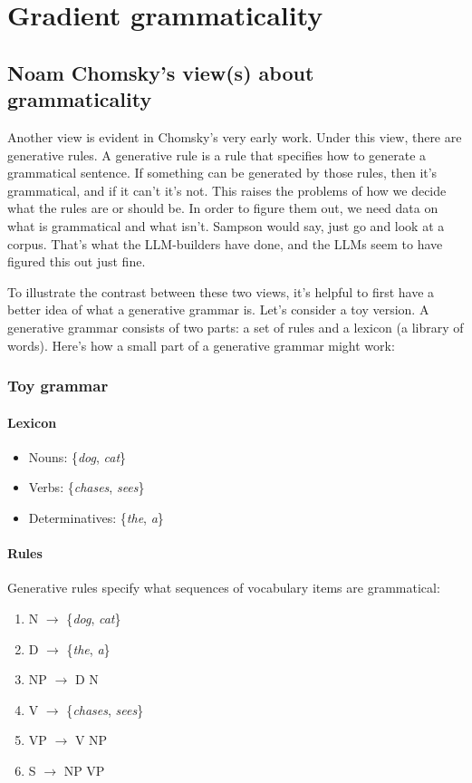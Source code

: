 \chapter{Gradient grammaticality}

\section{Noam Chomsky's view(s) about grammaticality}
Another view is evident in Chomsky's very early work. Under this view, there are generative rules. A generative rule is a rule that specifies how to generate a grammatical sentence. If something can be generated by those rules, then it's grammatical, and if it can't it's not. This raises the problems of how we decide what the rules are or should be. In order to figure them out, we need data on what is grammatical and what isn't. Sampson would say, just go and look at a corpus. That's what the LLM-builders have done, and the LLMs seem to have figured this out just fine.

To illustrate the contrast between these two views, it's helpful to first have a better idea of what a generative grammar is. Let's consider a toy version. A generative grammar consists of two parts: a set of rules and a lexicon (a library of words). Here's how a small part of a generative grammar might work:

\subsection{Toy grammar}

\subsubsection*{Lexicon}
\begin{itemize}
 \item Nouns: \{\textit{dog}, \textit{cat}\}
 \item Verbs: \{\textit{chases}, \textit{sees}\}
 \item Determinatives: \{\textit{the}, \textit{a}\}
\end{itemize}

\subsubsection*{Rules}
Generative rules specify what sequences of vocabulary items are grammatical:

\begin{enumerate}
 \item N \(\rightarrow\) \{\textit{dog}, \textit{cat}\}
 \item D \(\rightarrow\) \{\textit{the}, \textit{a}\}
 \item NP \(\rightarrow\) D N
 \item V \(\rightarrow\) \{\textit{chases}, \textit{sees}\}
 \item VP \(\rightarrow\) V NP
 \item S \(\rightarrow\) NP VP
\end{enumerate}

